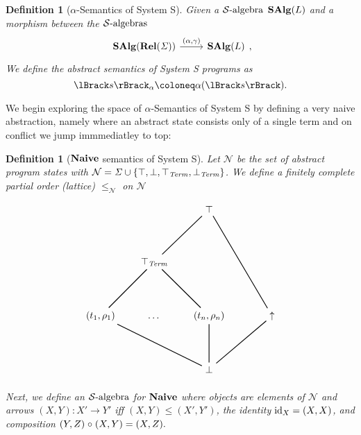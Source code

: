 \documentclass{article}
\newtheorem{definition}[theorem]{Definition}
\newcommand{\fail}{\ensuremath \text{$\uparrow$}}
\newcommand{\Term}{\ensuremath \mathit{Term}}
\newcommand{\sem}[1]{\ensuremath \lBrack #1 \rBrack}
\newcommand{\Cat}[1]{\ensuremath \mathbf{#1}}
\newcommand{\State}{\ensuremath \mathit{\Sigma} }
\newcommand{\id}{\ensuremath \operatorname{id}}
\newcommand{\Rel}{\ensuremath \Cat{Rel}}
\newcommand{\Naive}{\ensuremath \Cat{Naive}}
\newcommand{\SAlgebra}{\ensuremath \mathcal{S}\text{-algebra}}
\newcommand{\SAlgebras}{\ensuremath \mathcal{S}\text{-algebras}}
\newcommand{\SAlg}{\ensuremath \Cat{SAlg}}
\newcommand{\ttop}{\ensuremath \top_{\Term}}
\newcommand{\tbot}{\ensuremath \bot_{\Term}}
\newcommand{\comp}{\ensuremath \mathrel{\circ}}
\begin{document}
\begin{definition}[$\alpha$-Semantics of System S] \normalfont
  Given a $\SAlgebra$ $\SAlg(L)$ and a morphism between the $\SAlgebras$
  \[
    \begin{tikzcd}
      \SAlg(\Rel(\State)) \arrow{r}{(\alpha ,\gamma)} & \SAlg(L)
    \end{tikzcd},
  \]
  We define the abstract semantics of System S programs as \[\sem{s}_\alpha \coloneq \alpha(\sem{s}). \]
\end{definition}

We begin exploring the space of $\alpha$-Semantics of System S by defining a very naive abstraction, namely where an abstract state consists only of a single term and on conflict we jump immmediatley to top:
 
\begin{definition}[$\Naive$ semantics of System S] \normalfont
  Let $\mathcal{N}$ be the set of abstract program states with $\mathcal{N} = \State \cup \lbrace \top, \bot, \ttop, \tbot \rbrace$. We define a finitely complete partial order (lattice) $\leq_\mathcal{N}$ on $\mathcal{N}$
  \[
    \begin{tikzpicture}
     \matrix (m) [matrix of nodes, row sep=4em, column sep=2em]
    {                              &                        & \node (top) {$\top$};       &                       &                         \\
                                   & \node (ttop){$\ttop$}; &                             &                       &                          \\
      \node (t1) {$(t_1,\rho_1)$}; & \node {\ldots};        & \node (tn) {$(t_n,\rho_n)$}; &                       & \node (fail) {$\fail$}; \\
                                   &                        & \node (bot) {$\bot$};       &                       &                          \\
    };

    \draw [thick] (ttop) -- (top);
    \draw [thick] (fail) -- (top);
    \draw [thick] (t1) -- (ttop);
    \draw [thick] (tn) -- (ttop);
    \draw [thick] (bot) -- (t1);
    \draw [thick] (bot) -- (tn);
    \draw [thick] (bot) -- (fail);
    \end{tikzpicture}
  \]

  Next, we define an $\SAlgebra$ for $\Naive$ where objects are elements of $\mathcal{N}$ and arrows $(X,Y) : X' \rightarrow Y'$ iff $(X,Y) \leq (X',Y')$, the identity $\id_X = (X,X)$, and composition $(Y,Z) \comp (X,Y) = (X,Z).$


\end{definition}
\end{document}
